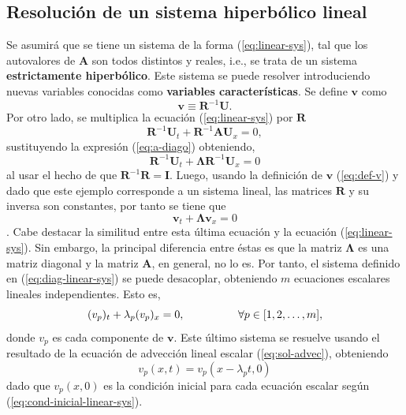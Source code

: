 \subsection{Resolución de un sistema hiperbólico lineal}
\label{sec:resolucion-hiperbolico}
Se asumirá que se tiene un sistema de la forma (\ref{eq:linear-sys}), tal que los autovalores de $\mathbf{A}$ son todos distintos y reales, i.e., se trata de un sistema \textbf{estrictamente hiperbólico}. Este sistema se puede resolver introduciendo nuevas variables conocidas como \textbf{variables características}. Se define $\mathbf{v}$ como
\begin{equation}
	\mathbf{v} \equiv \mathbf{R}^{-1} \mathbf{U}.
	\label{eq:def-v}
\end{equation}
Por otro lado, se multiplica la ecuación (\ref{eq:linear-sys}) por $\mathbf{R}$
\begin{equation}
	\mathbf{R}^{-1}\mathbf{U}_t + \mathbf{R}^{-1} \mathbf{A} \mathbf{U}_x = 0,
\end{equation}
sustituyendo la expresión (\ref{eq:a-diago}) obteniendo,
\begin{equation}
	\mathbf{R}^{-1}\mathbf{U}_t + \mathbf{\Lambda} \mathbf{R}^{-1} \mathbf{U}_x = 0
\end{equation}
al usar el hecho de que $\mathbf{R}^{-1} \mathbf{R} = \mathbf{I}$. Luego, usando la definición de $\mathbf{v}$ (\ref{eq:def-v}) y dado que este ejemplo corresponde a un sistema lineal, las matrices $\mathbf{R}$ y su inversa son constantes, por tanto se tiene que
\begin{equation}
	\mathbf{v}_t + \mathbf{\Lambda} \mathbf{v}_x = 0
	\label{eq:diag-linear-sys}
\end{equation}.
Cabe destacar la similitud entre esta última ecuación y la ecuación (\ref{eq:linear-sys}). Sin embargo, la principal diferencia entre éstas es que la matriz $\mathbf{\Lambda}$ es una matriz diagonal y la matriz $\mathbf{A}$, en general, no lo es. Por tanto, el sistema definido en (\ref{eq:diag-linear-sys}) se puede desacoplar, obteniendo $m$ ecuaciones escalares lineales independientes. Esto es,
\begin{equation}
	(v_p)_t + \lambda_{p} (v_{p})_x = 0, \hspace{17mm} \forall p \in [1,2, \dots, m],
\end{equation}
donde $v_p$ es cada componente de $\mathbf{v}$. Este último sistema se resuelve usando el resultado de la ecuación de advección lineal escalar (\ref{eq:sol-advec}), obteniendo
\begin{equation}
	v_p(x,t) = v_p(x - \lambda_{p}t, 0)
	\label{eq:v-sub-p}
\end{equation}
dado que $v_p(x, 0)$ es la condición inicial para cada ecuación escalar según (\ref{eq:cond-inicial-linear-sys}).

